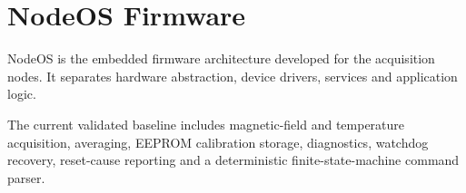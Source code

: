\chapter{NodeOS Firmware}

NodeOS is the embedded firmware architecture developed for the acquisition nodes. It separates hardware abstraction, device drivers, services and application logic.

The current validated baseline includes magnetic-field and temperature acquisition, averaging, EEPROM calibration storage, diagnostics, watchdog recovery, reset-cause reporting and a deterministic finite-state-machine command parser.
